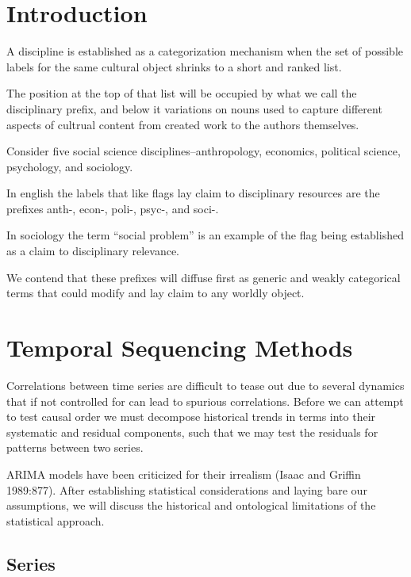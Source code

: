 \section{Introduction}\label{introduction}

A discipline is established as a categorization mechanism when the set
of possible labels for the same cultural object shrinks to a short and
ranked list.

The position at the top of that list will be occupied by what we call
the disciplinary prefix, and below it variations on nouns used to
capture different aspects of cultrual content from created work to the
authors themselves.

Consider five social science disciplines--anthropology, economics,
political science, psychology, and sociology.

In english the labels that like flags lay claim to disciplinary
resources are the prefixes anth-, econ-, poli-, psyc-, and soci-.

In sociology the term ``social problem'' is an example of the flag being
established as a claim to disciplinary relevance.

We contend that these prefixes will diffuse first as generic and weakly
categorical terms that could modify and lay claim to any worldly object.

\section{Temporal Sequencing Methods}\label{temporal-sequencing-methods}

Correlations between time series are difficult to tease out due to
several dynamics that if not controlled for can lead to spurious
correlations. Before we can attempt to test causal order we must
decompose historical trends in terms into their systematic and residual
components, such that we may test the residuals for patterns between two
series.

ARIMA models have been criticized for their irrealism (Isaac and Griffin
1989:877). After establishing statistical considerations and laying bare
our assumptions, we will discuss the historical and ontological
limitations of the statistical approach.

\subsection{Series}\label{series}

